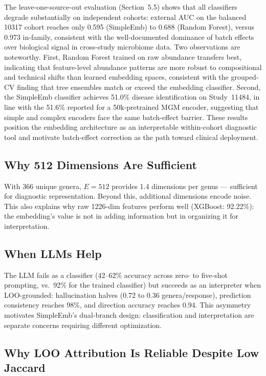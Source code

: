 \documentclass[11pt,a4paper]{article}
\begin{document}
The leave-one-source-out evaluation (Section~5.5) shows that all classifiers degrade substantially on independent cohorts: external AUC on the balanced 10317 cohort reaches only 0.595 (SimpleEmb) to 0.688 (Random Forest), versus 0.973 in-family, consistent with the well-documented dominance of batch effects over biological signal in cross-study microbiome data. Two observations are noteworthy. First, Random Forest trained on raw abundance transfers best, indicating that feature-level abundance patterns are more robust to compositional and technical shifts than learned embedding spaces, consistent with the grouped-CV finding that tree ensembles match or exceed the embedding classifier. Second, the SimpleEmb classifier achieves 51.0\% disease identification on Study~11484, in line with the 51.6\% reported for a 50k-pretrained MGM encoder, suggesting that simple and complex encoders face the same batch-effect barrier. These results position the embedding architecture as an interpretable within-cohort diagnostic tool and motivate batch-effect correction as the path toward clinical deployment.

\subsection{Why 512 Dimensions Are Sufficient}

With 366 unique genera, $E{=}512$ provides 1.4 dimensions per genus --- sufficient for diagnostic representation. Beyond this, additional dimensions encode noise. This also explains why raw 1226-dim features perform well (XGBoost: 92.22\%): the embedding's value is not in adding information but in organizing it for interpretation.

\subsection{When LLMs Help}

The LLM fails as a classifier (42--62\% accuracy across zero- to five-shot prompting, vs.\ 92\% for the trained classifier) but succeeds as an interpreter when LOO-grounded: hallucination halves (0.72 to 0.36 genera/response), prediction consistency reaches 98\%, and direction accuracy reaches 0.94. This asymmetry motivates SimpleEmb's dual-branch design: classification and interpretation are separate concerns requiring different optimization.

\subsection{Why LOO Attribution Is Reliable Despite Low Jaccard}
\end{document}

